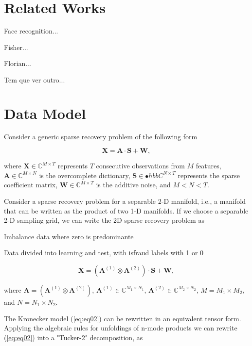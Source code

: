 \section{Related Works}

Face recognition...

Fisher...

Florian...

Tem que ver outro...

\section{Data Model}

Consider a generic sparse recovery problem of the following form

\begin{equation}\label{eq:eq01}
\boldsymbol{X} = \boldsymbol{A} \cdot \boldsymbol{S} + \boldsymbol{W},
\end{equation}

where $\boldsymbol{X} \in \mathbb{C}^{M \times T}$ represents $T$ consecutive observations from $M$ features, $\boldsymbol{A} \in \mathbb{C}^{M \times N}$ is the overcomplete dictionary, $\boldsymbol{S} \in \mathbb{•}hbb{C}^{N \times T}$ represents the sparse coefficient matrix, $\boldsymbol{W} \in \mathbb{C}^{M \times T}$ is the additive noise, and $M < N < T$.

Consider a sparse recovery problem for a separable 2-D manifold, i.e., a manifold that can be written as the product of two 1-D manifolds. If we choose a separable 2-D sampling grid, we can write the 2D sparse recovery problem as

Imbalance data where zero is predominante

Data divided into learning and test, with isfraud labels with 1 or 0

\begin{equation}\label{eq:eq02}
\boldsymbol{X} = (\boldsymbol{A}^{(1)} \otimes \boldsymbol{A}^{(2)}) \cdot \boldsymbol{S} + \boldsymbol{W},
\end{equation}

where $\boldsymbol{A} = (\boldsymbol{A}^{(1)} \otimes \boldsymbol{A}^{(2)})$, $\boldsymbol{A}^{(1)} \in \mathbb{C}^{M_1 \times N_1}$, $\boldsymbol{A}^{(2)} \in \mathbb{C}^{M_2 \times N_2}$, $M = M_1 \times M_2$, and $N = N_1 \times N_2$.

The Kronecker model (\ref{eq:eq02}) can be rewritten in an equivalent tensor form. Applying the algebraic rules for unfoldings of n-mode products \cite{roemer2014tensor} we can rewrite (\ref{eq:eq02}) into a "Tucker-2" decomposition, as


